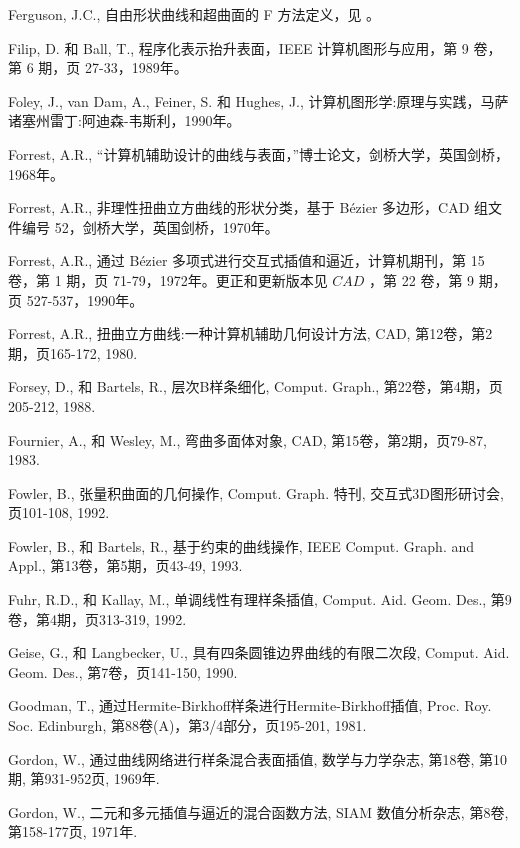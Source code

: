 \documentclass[../main.tex]{subfiles}
\begin{document}
\begin{BookBibliography}
 Ferguson, J.C., 自由形状曲线和超曲面的 F 方法定义，见 \cite{Pieg93}。

 Filip, D. 和 Ball, T., 程序化表示抬升表面，IEEE 计算机图形与应用，第 9 卷，第 6 期，页 27-33，1989年。

 Foley, J., van Dam, A., Feiner, S. 和 Hughes, J., 计算机图形学:原理与实践，马萨诸塞州雷丁:阿迪森-韦斯利，1990年。

 Forrest, A.R., “计算机辅助设计的曲线与表面，”博士论文，剑桥大学，英国剑桥，1968年。

 Forrest, A.R., 非理性扭曲立方曲线的形状分类，基于 Bézier 多边形，CAD 组文件编号 52，剑桥大学，英国剑桥，1970年。

 Forrest, A.R., 通过 Bézier 多项式进行交互式插值和逼近，计算机期刊，第 15 卷，第 1 期，页 71-79，1972年。更正和更新版本见 \({CAD}\) ，第 22 卷，第 9 期，页 527-537，1990年。

 Forrest, A.R., 扭曲立方曲线:一种计算机辅助几何设计方法, CAD, 第12卷，第2期，页165-172, 1980.

 Forsey, D., 和 Bartels, R., 层次B样条细化, Comput. Graph., 第22卷，第4期，页205-212, 1988.

 Fournier, A., 和 Wesley, M., 弯曲多面体对象, CAD, 第15卷，第2期，页79-87, 1983.

 Fowler, B., 张量积曲面的几何操作, Comput. Graph. 特刊, 交互式3D图形研讨会, 页101-108, 1992.

 Fowler, B., 和 Bartels, R., 基于约束的曲线操作, IEEE Comput. Graph. and Appl., 第13卷，第5期，页43-49, 1993.

 Fuhr, R.D., 和 Kallay, M., 单调线性有理样条插值, Comput. Aid. Geom. Des., 第9卷，第4期，页313-319, 1992.

 Geise, G., 和 Langbecker, U., 具有四条圆锥边界曲线的有限二次段, Comput. Aid. Geom. Des., 第7卷，页141-150, 1990.

 Goodman, T., 通过Hermite-Birkhoff样条进行Hermite-Birkhoff插值, Proc. Roy. Soc. Edinburgh, 第88卷(A)，第3/4部分，页195-201, 1981.

 Gordon, W., 通过曲线网络进行样条混合表面插值, 数学与力学杂志, 第18卷, 第10期, 第931-952页, 1969年.

 Gordon, W., 二元和多元插值与逼近的混合函数方法, SIAM 数值分析杂志, 第8卷, 第158-177页, 1971年.


\end{BookBibliography}
\end{document}
